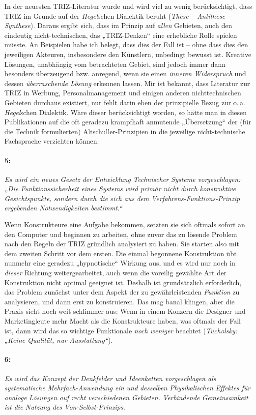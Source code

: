 \documentclass[12pt,a4paper]{article}
\newcommand{\these}[2]{\paragraph{#1:} \emph{#2}\par}
\begin{document}
In der neuesten TRIZ-Literatur wurde und wird viel zu wenig berücksichtigt,
dass TRIZ im Grunde auf der \emph{Hegel\/}schen Dialektik beruht (\emph{These
  -- Antithese -- Synthese}).  Daraus ergibt sich, dass im Prinzip auf
\emph{allen} Gebieten, auch den eindeutig nicht-technischen, das „TRIZ-Denken“
eine erhebliche Rolle spielen müsste. An Beispielen habe ich belegt, dass dies
der Fall ist – ohne dass dies den jeweiligen Akteuren, insbesondere den
Künstlern, unbedingt bewusst ist. Kreative Lösungen, unabhängig vom
betrachteten Gebiet, sind jedoch immer dann besonders überzeugend bzw.
anregend, wenn sie einen \emph{inneren Widerspruch} und dessen
\emph{überraschende Lösung} erkennen lassen. Mir ist bekannt, dass Literatur
zur TRIZ in Werbung, Personalmanagement und einigen anderen nichttechnischen
Gebieten durchaus existiert, nur fehlt darin eben der prinzipielle Bezug zur
o.\,a. \emph{Hegel\/}schen Dialektik. Wäre dieser berücksichtigt worden, so
hätte man in diesen Publikationen auf die oft geradezu krampfhaft anmutende
„Übersetzung“ der (für die Technik formulierten) Altschuller-Prinzipien in die
jeweilige nicht-technische Fachsprache verzichten können.

\these{5}{Es wird ein neues Gesetz der Entwicklung Technischer Systeme
  vorgeschlagen: „Die Funktionssicherheit eines Systems wird primär nicht
  durch konstruktive Gesichtspunkte, sondern durch die sich aus dem
  Verfahrens-Funktions-Prinzip ergebenden Notwendigkeiten bestimmt.“}

Wenn Konstrukteure eine Aufgabe bekommen, setzten sie sich oftmals sofort an
den Computer und beginnen zu arbeiten, ohne zuvor das zu lösende Problem nach
den Regeln der TRIZ gründlich analysiert zu haben. Sie starten also mit dem
zweiten Schritt vor dem ersten. Die einmal begonnene Konstruktion übt nunmehr
eine geradezu „hypnotische“ Wirkung aus, und es wird nur noch in \emph{dieser}
Richtung weitergearbeitet, auch wenn die voreilig gewählte Art der
Konstruktion nicht optimal geeignet ist. Deshalb ist grundsätzlich
erforderlich, das Problem zunächst unter dem Aspekt der zu gewährleistenden
\emph{Funktion} zu analysieren, und dann erst zu konstruieren. Das mag banal
klingen, aber die Praxis sieht noch weit schlimmer aus: Wenn in einem Konzern
die Designer und Marketingleute mehr Macht als die Konstrukteure haben, was
oftmals der Fall ist, dann wird das so wichtige Funktionale \emph{noch
  weniger} beachtet (\emph{Tucholsky: „Keine Qualität, nur Ausstattung“}).

\these{6}{Es wird das Konzept der Denkfelder und Ideenketten vorgeschlagen als
  systematische Mehrfach-Anwendung ein und desselben Physikalischen Effektes
  für analoge Lösungen auf recht verschiedenen Gebieten. Verbindende
  Gemeinsamkeit ist die Nutzung des \emph{Von-Selbst}-Prinzips.}
\end{document}
